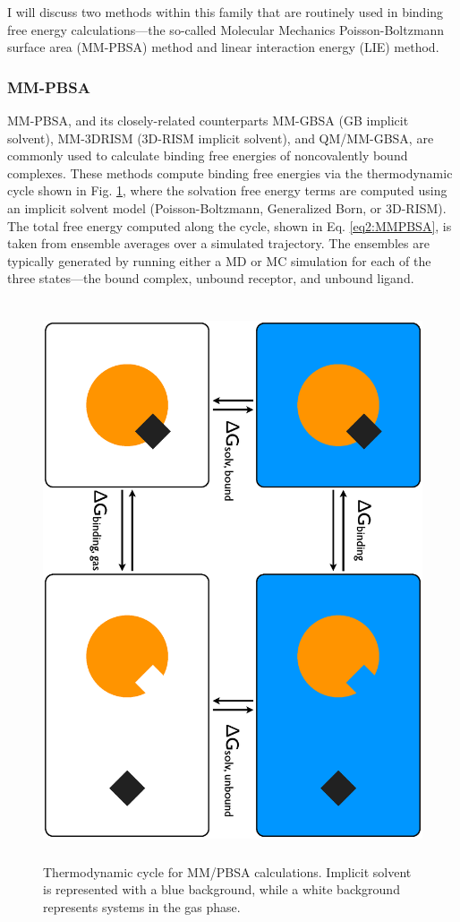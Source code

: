 I will discuss two methods within this family that are routinely used in binding
free energy calculations---the so-called Molecular Mechanics Poisson-Boltzmann
surface area (MM-PBSA) method \cite{Srinivasan_JAmChemSoc_1998_v120_p9401,
Massova2000} and linear interaction energy (LIE) method.
\cite{Aqvist_ProteinEng_1994_v7_p385, Hansson1998}

\subsubsection{MM-PBSA}

MM-PBSA, and its closely-related counterparts MM-GBSA (GB implicit solvent),
MM-3DRISM (3D-RISM implicit solvent), and QM/MM-GBSA, are commonly used to
calculate binding free energies of noncovalently bound complexes. These methods
compute binding free energies via the thermodynamic cycle shown in Fig.
\ref{fig2:MMPBSA}, where the solvation free energy terms are computed using an
implicit solvent model (\eg Poisson-Boltzmann, Generalized Born, or 3D-RISM).
The total free energy computed along the cycle, shown in Eq. \ref{eq2:MMPBSA},
is taken from ensemble averages over a simulated trajectory. The ensembles are
typically generated by running either a MD or MC simulation for each of the
three states---the bound complex, unbound receptor, and unbound ligand.
\cite{MMPBSApy}

\begin{figure}
   \includegraphics[height=6.5in, angle=90]{MMPBSA.ps}
   \caption{Thermodynamic cycle for MM/PBSA calculations. Implicit solvent is
            represented with a blue background, while a white background
            represents systems in the gas phase.}
   \label{fig2:MMPBSA}
\end{figure}

